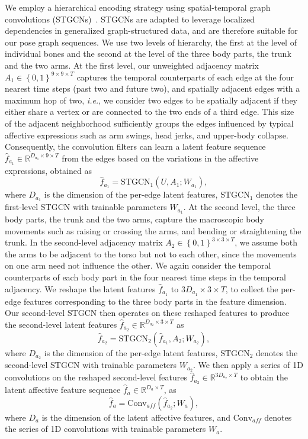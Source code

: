 \documentclass[conference,compsoc]{IEEEtran}
\theoremstyle{definition}
\newcommand{\parens}[1]{\left(#1\right)}
\newcommand{\braces}[1]{\left\{#1\right\}}
\begin{document}
We employ a hierarchical encoding strategy using spatial-temporal graph convolutions (STGCNs)~\cite{stgcn}. STGCNs are adapted to leverage localized dependencies in generalized graph-structured data, and are therefore suitable for our pose graph sequences. We use two levels of hierarchy, the first at the level of individual bones and the second at the level of the three body parts, the trunk and the two arms. At the first level, our unweighted adjacency matrix $A_1 \in \braces{0, 1}^{9 \times 9 \times T}$ captures the temporal counterparts of each edge at the four nearest time steps (past two and future two), and spatially adjacent edges with a maximum hop of two, \textit{i.e.}, we consider two edges to be spatially adjacent if they either share a vertex or are connected to the two ends of a third edge. This size of the adjacent neighborhood sufficiently groups the edges influenced by typical affective expressions such as arm swings, head jerks, and upper-body collapse. Consequently, the convolution filters can learn a latent feature sequence $\hat{f}_{a_1} \in \mathbb{R}^{D_{a_1} \times 9 \times T}$ from the edges based on the variations in the affective expressions, obtained as
\begin{equation}
    \hat{f}_{a_1} = \textrm{STGCN}_1\parens{U, A_1; W_{a_1}},
\end{equation}
where $D_{a_1}$ is the dimension of the per-edge latent features, $\textrm{STGCN}_1$ denotes the first-level STGCN with trainable parameters $W_{a_1}$. At the second level, the three body parts, the trunk and the two arms, capture the macroscopic body movements such as raising or crossing the arms, and bending or straightening the trunk. In the second-level adjacency matrix $A_2 \in \braces{0, 1}^{3 \times 3 \times T}$, we assume both the arms to be adjacent to the torso but not to each other, since the movements on one arm need not influence the other. We again consider the temporal counterparts of each body part in the four nearest time steps in the temporal adjacency. We reshape the latent features $\hat{f}_{a_1}$ to $3D_{a_1} \times 3 \times T$, to collect the per-edge features corresponding to the three body parts in the feature dimension. Our second-level STGCN then operates on these reshaped features to produce the second-level latent features $\hat{f}_{a_2} \in \mathbb{R}^{D_{a_2} \times 3 \times T}$ as
\begin{equation}
    \hat{f}_{a_2} = \textrm{STGCN}_2\parens{\hat{f}_{a_1}, A_2; W_{a_2}},
\end{equation}
where $D_{a_2}$ is the dimension of the per-edge latent features, $\textrm{STGCN}_2$ denotes the second-level STGCN with trainable parameters $W_{a_2}$. We then apply a series of 1D convolutions on the reshaped second-level features $\hat{f}_{a_2} \in \mathbb{R}^{3D_{a_2} \times T}$ to obtain the latent affective feature sequence $\hat{f}_a \in \mathbb{R}^{D_a \times T}$, as
\begin{equation}
    \hat{f}_a = \textrm{Conv}_{aff}\parens{\hat{f}_{a_2}; W_{a}},
\end{equation}
where $D_a$ is the dimension of the latent affective features, and $\textrm{Conv}_{aff}$ denotes the series of 1D convolutions with trainable parameters $W_{a}$.
\end{document}
